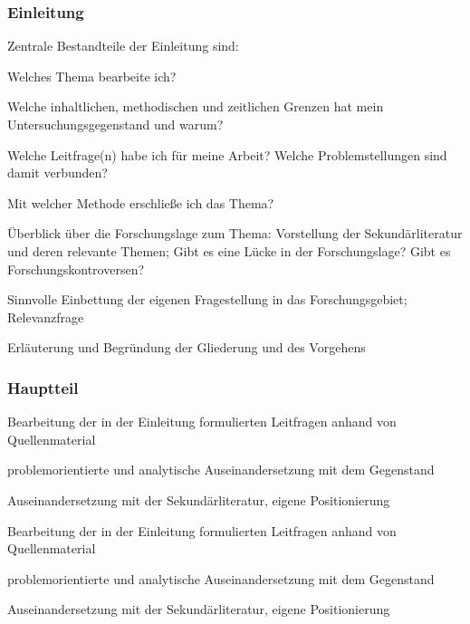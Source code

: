 \documentclass[a4paper,oneside,DIV8,10pt]{scrartcl}
\begin{document}
    \subsubsection{Einleitung}
        Zentrale Bestandteile der Einleitung sind:
        \begin{compactitem}
            \item Welches Thema bearbeite ich?
            \item Welche inhaltlichen, methodischen und zeitlichen Grenzen
            hat mein Untersuchungsgegenstand und warum?
            \item Welche Leitfrage(n) habe ich für meine Arbeit? Welche 
            Problemstellungen sind damit verbunden? 
            \item Mit welcher Methode erschließe ich das Thema?
            \item Überblick über die Forschungslage zum Thema: Vorstellung der 
            Sekundärliteratur und deren relevante Themen; Gibt es eine Lücke
            in der Forschungslage? Gibt es Forschungskontroversen?
            \item Sinnvolle Einbettung der eigenen Fragestellung in das 
            Forschungsgebiet; Relevanzfrage
            \item Erläuterung und Begründung der Gliederung und des Vorgehens
        \end{compactitem}

    \subsubsection{Hauptteil}
        \begin{compactitem}
            \item Bearbeitung der in der Einleitung formulierten Leitfragen
            anhand von Quellenmaterial
            \item problemorientierte und analytische Auseinandersetzung 
            mit dem Gegenstand
            \item Auseinandersetzung mit der Sekundärliteratur, eigene 
            Positionierung
            \item Bearbeitung der in der Einleitung formulierten Leitfragen
            anhand von Quellenmaterial
            \item problemorientierte und analytische Auseinandersetzung 
            mit dem Gegenstand
            \item Auseinandersetzung mit der Sekundärliteratur, eigene 
            Positionierung
        \end{compactitem}
\end{document}
